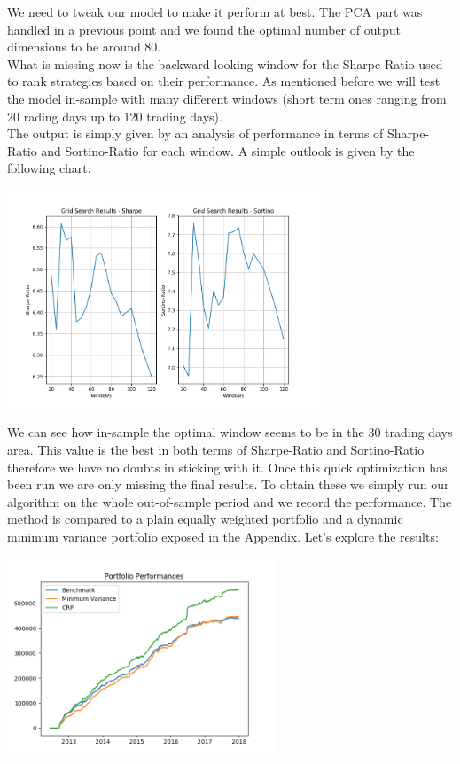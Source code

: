 We need to tweak our model to make it perform at best. The PCA part was handled in a previous point and we found the optimal number of output dimensions to be around 80.\\
What is missing now is the backward-looking window for the Sharpe-Ratio used to rank strategies based on their performance. As mentioned before we will test the model in-sample with many different windows (short term ones ranging from 20 rading days up to 120 trading days).\\
The output is simply given by an analysis of performance in terms of Sharpe-Ratio and Sortino-Ratio for each window. A simple outlook is given by the following chart:

\begin{center}
	\centering
	\includegraphics[width=0.7\textwidth]{HRP/CRP_Optimization.png}
	\label{CRP_Optimization}
\end{center}

We can see how in-sample the optimal window seems to be in the 30 trading days area. This value is the best in both terms of Sharpe-Ratio and Sortino-Ratio therefore we have no doubts in sticking with it. Once this quick optimization has been run we are only missing the final results. To obtain these we simply run our algorithm on the whole out-of-sample period and we record the performance. The method is compared to a plain equally weighted portfolio and a dynamic minimum variance portfolio exposed in the Appendix. Let's explore the results:

\begin{center}
	\centering
	\includegraphics[width=0.6\textwidth]{HRP/OOS_Equity_Line.png}
	\label{CRP_Equity_LIne}
\end{center}

